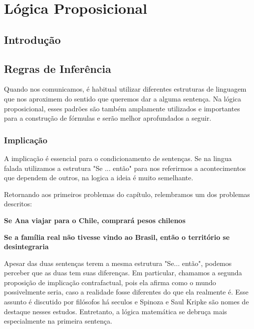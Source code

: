 \chapter{Lógica Proposicional}
\section{Introdução}

\section{Regras de Inferência}
Quando nos comunicamos, é habitual utilizar diferentes estruturas de linguagem que nos aproximem do sentido que queremos dar a alguma sentença. Na lógica proposicional, esses padrões são também amplamente utilizados e importantes para a construção de fórmulas e serão melhor aprofundados a seguir.

\subsection{Implicação} 
A implicação é essencial para o condicionamento de sentenças. Se na lingua falada utilizamos a estrutura "Se ... então" para nos referirmos a acontecimentos que dependem de outros, na logica a ideia é muito semelhante.

Retornando aos primeiros problemas do capítulo, relembramos um dos problemas descritos:
\begin{center}
\textbf{Se Ana viajar para o Chile, comprará pesos chilenos}

\textbf{Se a família real não tivesse vindo ao Brasil, então o território se desintegraria}
\end{center}

Apesar das duas sentenças terem a mesma estrutura "Se... então", podemos perceber que as duas tem suas diferenças. Em particular, chamamos a segunda proposição de implicação contrafactual, pois ela afirma como o mundo possivelmente seria, caso a realidade fosse diferentes do que ela realmente é. Esse assunto é discutido por filósofos há seculos e Spinoza e Saul Kripke são nomes de destaque nesses estudos. Entretanto, a lógica matemática se debruça mais especialmente na primeira sentença.

